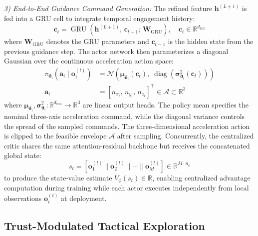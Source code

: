 \documentclass[lettersize,journal]{IEEEtran}
\newcommand{\hladd}[1]{{\color{blue}#1}}
\begin{document}
\emph{3) End-to-End Guidance Command Generation:} The refined feature $\mathbf{h}^{(L+1)}$ is fed into a GRU cell to integrate temporal engagement history:
\begin{equation}
\label{eq:gru}
\mathbf{c}_t = \operatorname{GRU}\!\left(\mathbf{h}^{(L+1)},\, \mathbf{c}_{t-1};\, \mathbf{W}_{\mathrm{GRU}}\right), \quad \mathbf{c}_t \in \mathbb{R}^{d_{\mathrm{rnn}}}
\end{equation}
where $\mathbf{W}_{\mathrm{GRU}}$ denotes the GRU parameters and $\mathbf{c}_{t-1}$ is the hidden state from the previous guidance step. The actor network then parameterizes a diagonal Gaussian over the \hladd{continuous acceleration action space}:
\begin{equation}
\label{eq:actor_dist}
\begin{split}
\pi_{\boldsymbol{\vartheta}_i}\!\left(\mathbf{a}_i \mid \mathbf{o}_i^{(t)}\right) &= \mathcal{N}\!\left(\boldsymbol{\mu}_{\boldsymbol{\vartheta}_i}(\mathbf{c}_t),\; \operatorname{diag}\!\left(\boldsymbol{\sigma}_{\boldsymbol{\vartheta}_i}^2(\mathbf{c}_t)\right)\right) \\
\mathbf{a}_i &= [n_{x_i},\,n_{y_i},\,n_{z_i}]^\top \in \mathcal{A}\subset\mathbb{R}^3
\end{split}
\end{equation}
where $\boldsymbol{\mu}_{\boldsymbol{\vartheta}_i}, \boldsymbol{\sigma}_{\boldsymbol{\vartheta}_i}^2: \mathbb{R}^{d_{\mathrm{rnn}}} \to \mathbb{R}^3$ are linear output heads. 
\hladd{The policy mean specifies the nominal three-axis acceleration
command, while the diagonal variance controls the spread of the sampled
commands.}
The three-dimensional acceleration action is clipped to the feasible envelope $\mathcal{A}$ after sampling. Concurrently, the centralized critic shares the same attention-residual backbone but receives the concatenated global state:
\begin{equation}
\label{eq:critic_input}
s_t = \left[\mathbf{o}_1^{(t)} \| \mathbf{o}_2^{(t)} \| \cdots \| \mathbf{o}_M^{(t)}\right] \in \mathbb{R}^{M \cdot n_o}
\end{equation}
to produce the state-value estimate $V_\phi(s_t) \in \mathbb{R}$, enabling centralized advantage computation during training while each actor executes independently from local observations $\mathbf{o}_i^{(t)}$ at deployment.

\subsection{Trust-Modulated Tactical Exploration}
\label{subsec:trust_exploration}
\end{document}
